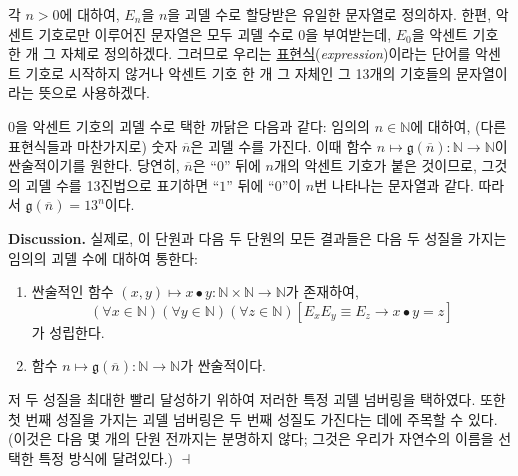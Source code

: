 \documentclass[12pt]{paper}
\newcommand{\gnum}{ \mathfrak{g} }
\newenvironment{context}[1][]{\noindent \textbf{{#1}.}}{\hfill $ \dashv $}
\begin{document}
  각 $n > 0$에 대하여, $E_{n}$을 $n$을 괴델 수로 할당받은 유일한 문자열로 정의하자.
  한편, 악센트 기호로만 이루어진 문자열은 모두 괴델 수로 $0$을 부여받는데, $E_{0}$을 악센트 기호 한 개 그 자체로 정의하겠다.
  그러므로 우리는 \underline{표현식}(\textit{expression})이라는 단어를 악센트 기호로 시작하지 않거나 악센트 기호 한 개 그 자체인 그 13개의 기호들의 문자열이라는 뜻으로 사용하겠다.

  $0$을 악센트 기호의 괴델 수로 택한 까닭은 다음과 같다:
  임의의 $n \in \mathbb{N}$에 대하여, (다른 표현식들과 마찬가지로) 숫자 $\overline{n}$은 괴델 수를 가진다.
  이때 함수 $n \mapsto \gnum \left( \overline{n} \right) : \mathbb{N} \to \mathbb{N}$이 싼술적이기를 원한다.
  당연히, $\overline{n}$은 ``$0$'' 뒤에 $n$개의 악센트 기호가 붙은 것이므로,
  그것의 괴델 수를 13진법으로 표기하면 ``$1$'' 뒤에 ``$0$''이 $n$번 나타나는 문자열과 같다.
  따라서 $\gnum \left( \overline{n} \right) = 13^{n}$이다.

  \begin{context}[Discussion]
    실제로, 이 단원과 다음 두 단원의 모든 결과들은 다음 두 성질을 가지는 임의의 괴델 수에 대하여 통한다:
    \begin{enumerate}
      \item 싼술적인 함수 $\left( x , y \right) \mapsto x \bullet y : \mathbb{N} \times \mathbb{N} \to \mathbb{N}$가 존재하여,
      $$ \left( \forall x \in \mathbb{N} \right) \left( \forall y \in \mathbb{N} \right) \left( \forall z \in \mathbb{N} \right) \left[ E_x E_y \equiv E_z \rightarrow x \bullet y = z \right] $$가 성립한다.
      \item 함수 $n \mapsto \gnum \left( \overline{n} \right) : \mathbb{N} \to \mathbb{N}$가 싼술적이다.
    \end{enumerate}

    저 두 성질을 최대한 빨리 달성하기 위하여 저러한 특정 괴델 넘버링을 택하였다.
    또한 첫 번째 성질을 가지는 괴델 넘버링은 두 번째 성질도 가진다는 데에 주목할 수 있다.
    (이것은 다음 몇 개의 단원 전까지는 분명하지 않다;
    그것은 우리가 자연수의 이름을 선택한 특정 방식에 달려있다.)
  \end{context}
\end{document}
